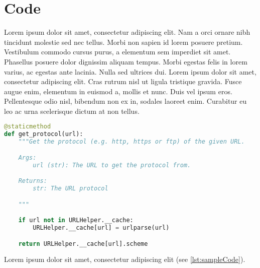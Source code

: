\chapter{Code}

Lorem ipsum dolor sit amet, consectetur adipiscing elit. Nam a orci ornare nibh tincidunt molestie sed nec tellus. Morbi non sapien id lorem posuere pretium. Vestibulum commodo cursus purus, a elementum sem imperdiet sit amet. Phasellus posuere dolor dignissim aliquam tempus. Morbi egestas felis in lorem varius, ac egestas ante lacinia. Nulla sed ultrices dui. Lorem ipsum dolor sit amet, consectetur adipiscing elit. Cras rutrum nisl ut ligula tristique gravida. Fusce augue enim, elementum in euismod a, mollis et nunc. Duis vel ipsum eros. Pellentesque odio nisl, bibendum non ex in, sodales laoreet enim. Curabitur eu leo ac urna scelerisque dictum at non tellus.

\begin{lstlisting}[caption={A sample Python method},label={lst:sampleCode},language=python]
@staticmethod
def get_protocol(url):
    """Get the protocol (e.g. http, https or ftp) of the given URL.

    Args:
        url (str): The URL to get the protocol from.

    Returns:
        str: The URL protocol

    """

    if url not in URLHelper.__cache:
        URLHelper.__cache[url] = urlparse(url)

    return URLHelper.__cache[url].scheme
\end{lstlisting}

Lorem ipsum dolor sit amet, consectetur adipiscing elit (see \ref{lst:sampleCode}).
